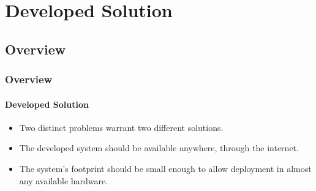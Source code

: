 \documentclass{beamer}
\begin{document}
\begin{frame}

\end{frame}


\section{Developed Solution}
\subsection{Overview}
\begin{frame}
  \frametitle{Overview}
  \framesubtitle{Developed Solution}

\begin{itemize}

\item
Two distinct problems warrant two different solutions.\\ \vspace{0.8cm}

\item
The developed system should be available anywhere, through the internet.\\ \vspace{0.8cm}

\item
The system's footprint should be small enough to allow deployment in almost any
available hardware.

\end{itemize}


\end{frame}
\end{document}
